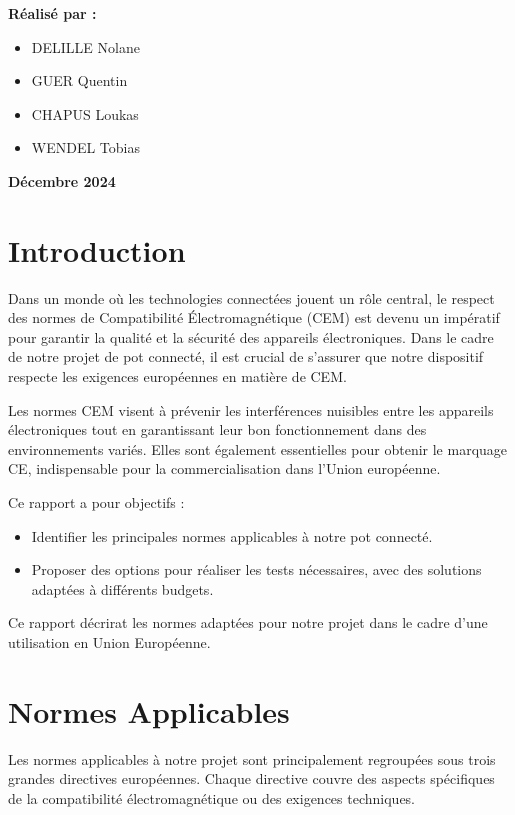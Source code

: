 \documentclass[a4paper,12pt]{article}
\begin{document}
\begin{titlepage}
\begin{center}
        \vspace{4cm}
        \textbf{Réalisé par :}
        \vspace{0.5cm}
        \begin{itemize}
            \item DELILLE Nolane
            \item GUER Quentin
            \item CHAPUS Loukas
            \item WENDEL Tobias
        \end{itemize}

        \vfill
        \Large
        \textbf{Décembre 2024}
    \end{center}
\end{titlepage}

\newpage
\tableofcontents
\newpage
\newpage

\section*{Introduction}
Dans un monde où les technologies connectées jouent un rôle central, le respect des normes de Compatibilité Électromagnétique (CEM) est devenu un impératif pour garantir la qualité et la sécurité des appareils électroniques. Dans le cadre de notre projet de pot connecté, il est crucial de s'assurer que notre dispositif respecte les exigences européennes en matière de CEM.

Les normes CEM visent à prévenir les interférences nuisibles entre les appareils électroniques tout en garantissant leur bon fonctionnement dans des environnements variés. Elles sont également essentielles pour obtenir le marquage CE, indispensable pour la commercialisation dans l'Union européenne.

Ce rapport a pour objectifs :
\begin{itemize}
    \item Identifier les principales normes applicables à notre pot connecté.
    \item Proposer des options pour réaliser les tests nécessaires, avec des solutions adaptées à différents budgets.
\end{itemize}
Ce rapport décrirat les normes adaptées pour notre projet dans le cadre d'une utilisation en Union Européenne.

\section{Normes Applicables}
Les normes applicables à notre projet sont principalement regroupées sous trois grandes directives européennes. Chaque directive couvre des aspects spécifiques de la compatibilité électromagnétique ou des exigences techniques.
\end{document}
